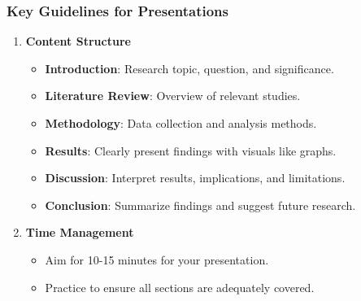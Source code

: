 \documentclass[aspectratio=169]{beamer}
\begin{document}
\begin{frame}[fragile]
    \frametitle{Key Guidelines for Presentations}
    \begin{enumerate}
        \item \textbf{Content Structure}
            \begin{itemize}
                \item \textbf{Introduction}: Research topic, question, and significance.
                \item \textbf{Literature Review}: Overview of relevant studies.
                \item \textbf{Methodology}: Data collection and analysis methods.
                \item \textbf{Results}: Clearly present findings with visuals like graphs.
                \item \textbf{Discussion}: Interpret results, implications, and limitations.
                \item \textbf{Conclusion}: Summarize findings and suggest future research.
            \end{itemize}
        \item \textbf{Time Management}
            \begin{itemize}
                \item Aim for 10-15 minutes for your presentation.
                \item Practice to ensure all sections are adequately covered.
            \end{itemize}
    \end{enumerate}
\end{frame}
\end{document}
